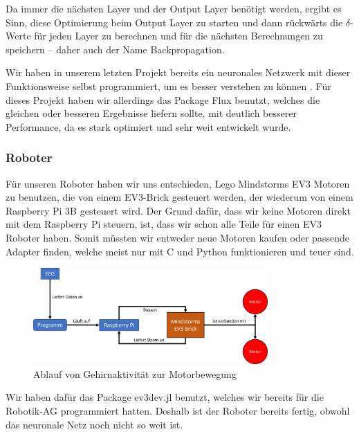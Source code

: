 \documentclass{scrartcl}
\begin{document}
	Da immer die nächsten Layer und der Output Layer benötigt werden, ergibt es Sinn, diese Optimierung beim Output Layer zu starten und dann rückwärts die \mbox{$\delta$-Werte} für jeden Layer zu berechnen und für die nächsten Berechnungen zu speichern -- daher auch der Name Backpropagation. \cite{MITNeuronale} \cite{3b1b:fft} \cite{brotcrunsher:backwardpass}


	Wir haben in unserem letzten Projekt bereits ein neuronales Netzwerk mit dieser Funktionsweise selbst programmiert, um es besser verstehen zu können \cite{AIComposer}. Für dieses Projekt haben wir allerdings das Package Flux benutzt, welches die gleichen oder besseren Ergebnisse liefern sollte, mit deutlich besserer Performance, da es stark optimiert und sehr weit entwickelt wurde.

	\subsubsection{Roboter}

	Für unseren Roboter haben wir uns entschieden, Lego Mindstorms EV3 Motoren zu benutzen, die von einem EV3-Brick gesteuert werden, der wiederum von einem Raspberry Pi 3B gesteuert wird. Der Grund dafür, dass wir keine Motoren direkt mit dem Raspberry Pi steuern, ist, dass wir schon alle Teile für einen EV3 Roboter haben. Somit müssten wir entweder neue Motoren kaufen oder passende Adapter finden, welche meist nur mit C und Python funktionieren und teuer sind.

	\begin{figure}[h!]
		\centering
		\includegraphics[width=0.8\textwidth]{pictures/roboter-funktionsweise.png}
		\caption{Ablauf von Gehirnaktivität zur Motorbewegung}
	\end{figure}

	Wir haben dafür das Package ev3dev.jl benutzt, welches wir bereits für die Robotik-AG programmiert hatten. Deshalb ist der Roboter bereits fertig, obwohl das neuronale Netz noch nicht so weit ist.
\end{document}

